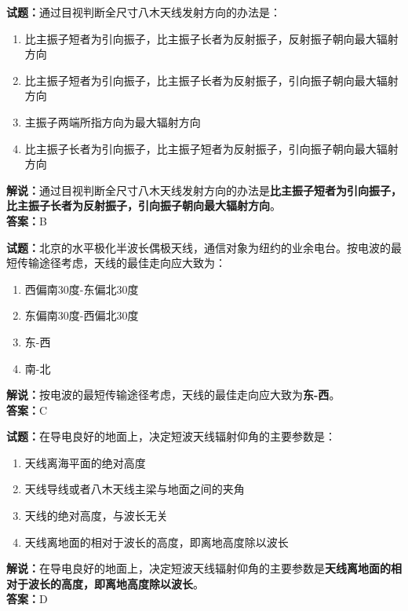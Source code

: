 \documentclass{ctexbook}
\begin{document}
\vspace{1em}

\textbf{试题：}通过目视判断全尺寸八木天线发射方向的办法是：
\begin{enumerate}[leftmargin=3em]
  \item 比主振子短者为引向振子，比主振子长者为反射振子，反射振子朝向最大辐射方向
  \item 比主振子短者为引向振子，比主振子长者为反射振子，引向振子朝向最大辐射方向
  \item 主振子两端所指方向为最大辐射方向
  \item 比主振子长者为引向振子，比主振子短者为反射振子，引向振子朝向最大辐射方向
\end{enumerate}
\noindent\textbf{解说：}通过目视判断全尺寸八木天线发射方向的办法是\textbf{比主振子短者为引向振子，比主振子长者为反射振子，引向振子朝向最大辐射方向}。\\\noindent\textbf{答案：}B

\vspace{1em}

\textbf{试题：}北京的水平极化半波长偶极天线，通信对象为纽约的业余电台。按电波的最短传输途径考虑，天线的最佳走向应大致为：
\begin{enumerate}[leftmargin=3em]
  \item 西偏南30度-东偏北30度
  \item 东偏南30度-西偏北30度
  \item 东-西
  \item 南-北
\end{enumerate}
\noindent\textbf{解说：}按电波的最短传输途径考虑，天线的最佳走向应大致为\textbf{东-西}。\\\noindent\textbf{答案：}C

\vspace{1em}

\textbf{试题：}在导电良好的地面上，决定短波天线辐射仰角的主要参数是：
\begin{enumerate}[leftmargin=3em]
  \item 天线离海平面的绝对高度
  \item 天线导线或者八木天线主梁与地面之间的夹角
  \item 天线的绝对高度，与波长无关
  \item 天线离地面的相对于波长的高度，即离地高度除以波长
\end{enumerate}
\noindent\textbf{解说：}在导电良好的地面上，决定短波天线辐射仰角的主要参数是\textbf{天线离地面的相对于波长的高度，即离地高度除以波长}。\\\noindent\textbf{答案：}D
\end{document}
